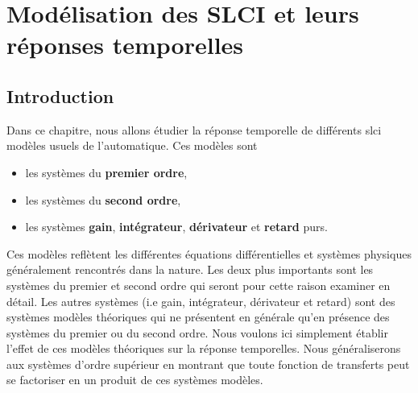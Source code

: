 \chapter[Modélisation des SLCI]
        {Modélisation des SLCI\label{chap-model} et leurs réponses temporelles}
\minitoc
\newpage
\section{Introduction}
Dans ce chapitre, nous allons étudier la réponse 
temporelle de différents \gls{slci} modèles usuels de l'automatique. 
Ces modèles sont 
\begin{itemize}
    \item les systèmes du \textbf{premier ordre},
    \item les systèmes du \textbf{second ordre},
    \item les systèmes \textbf{gain}, \textbf{intégrateur}, \textbf{dérivateur} 
          et \textbf{retard} purs.
\end{itemize}
Ces modèles reflètent les différentes équations différentielles et 
systèmes physiques généralement rencontrés dans la nature.
Les deux plus importants sont les systèmes du premier et second ordre 
qui seront pour cette raison examiner en détail. 
Les autres systèmes (i.e gain, intégrateur, dérivateur et retard) 
sont des systèmes modèles théoriques qui ne présentent en générale qu'en 
présence des systèmes du premier ou du second ordre. Nous voulons ici simplement
établir l'effet de ces modèles théoriques sur la réponse temporelles.
Nous généraliserons aux systèmes d'ordre supérieur en montrant 
que toute fonction de transferts peut se factoriser en un produit
de ces systèmes modèles.

